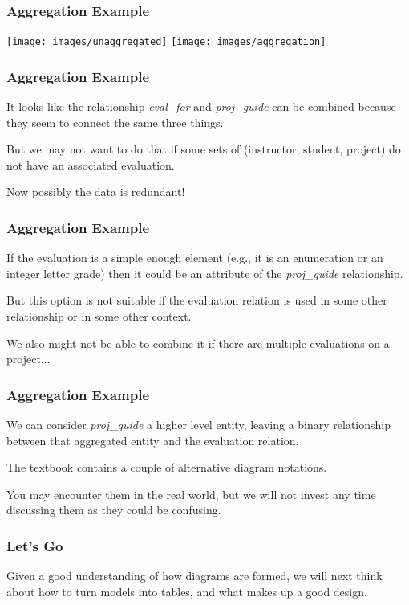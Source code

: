 \begin{frame}
\frametitle{Aggregation Example}

\begin{center}
\texttt{[image: images/unaggregated]}
\texttt{[image: images/aggregation]}
\end{center}


\end{frame}



\begin{frame}
\frametitle{Aggregation Example}

It looks like the relationship \textit{eval\_for} and \textit{proj\_guide} can be combined because they seem to connect the same three things. 

But we may not want to do that if some sets of (instructor, student, project) do not have an associated evaluation. 

Now possibly the data is redundant! 

\end{frame}



\begin{frame}
\frametitle{Aggregation Example}

If the evaluation is a simple enough element (e.g., it is an enumeration or an integer letter grade) then it could be an attribute of the \textit{proj\_guide} relationship. 

But this option is not suitable if the evaluation relation is used in some other relationship or in some other context. 

We  also might not be able to combine it if there are multiple evaluations on a project...

\end{frame}



\begin{frame}
\frametitle{Aggregation Example}

We can consider \textit{proj\_guide} a higher level entity,  leaving a binary relationship between that aggregated entity and the evaluation relation.

The textbook contains a couple of alternative diagram notations. 

You may encounter them in the real world, but we will not invest any time discussing them as they could be confusing.

\end{frame}



\begin{frame}
\frametitle{Let's Go}

Given a good understanding of how diagrams are formed, we will next think about how to turn models into tables, and what makes up a good design.



\end{frame}





